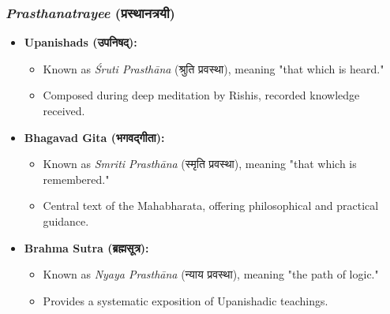 \begin{frame}[fragile]\frametitle{\textit{Prasthanatrayee} (प्रस्थानत्रयी)}
    \begin{itemize}
        \item \textbf{Upanishads (उपनिषद्):}
        \begin{itemize}
            \item Known as \textit{Śruti Prasthāna} (श्रुति प्रवस्था), meaning "that which is heard."
            \item Composed during deep meditation by Rishis, recorded knowledge received.
        \end{itemize}
        \item \textbf{Bhagavad Gita (भगवद्गीता):}
        \begin{itemize}
            \item Known as \textit{Smriti Prasthāna} (स्मृति प्रवस्था), meaning "that which is remembered."
            \item Central text of the Mahabharata, offering philosophical and practical guidance.
        \end{itemize}
        \item \textbf{Brahma Sutra (ब्रह्मसूत्र):}
        \begin{itemize}
            \item Known as \textit{Nyaya Prasthāna} (न्याय प्रवस्था), meaning "the path of logic."
            \item Provides a systematic exposition of Upanishadic teachings.
        \end{itemize}
    \end{itemize}
\end{frame}



